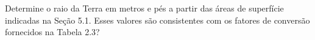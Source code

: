 Determine o raio da Terra em metros e pés a partir das áreas de superfície indicadas na Seção 5.1. Esses valores são consistentes com os fatores de conversão fornecidos na Tabela 2.3?
